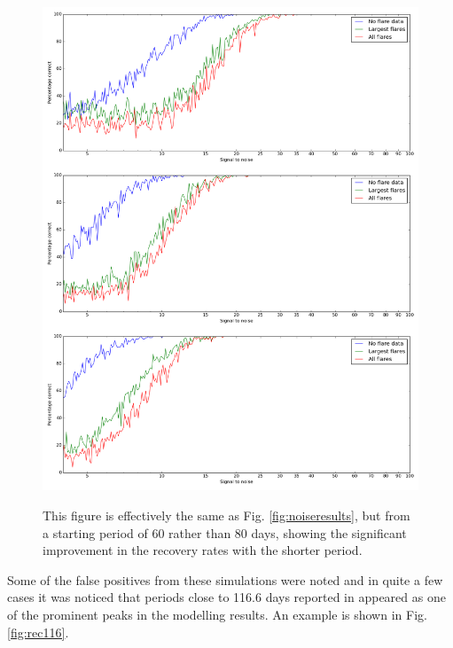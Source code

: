 \begin{figure}[!htbp]
\begin{center}
\includegraphics[scale=0.25]{Figures/Np60.png} \\
\end{center}
\caption{This figure is effectively the same as Fig. \ref{fig:noiseresults}, but from a starting period of 60 rather
  than 80 days, showing the significant improvement in the recovery rates with the shorter period.}
\protect\label{fig:noiseresults60}
\end{figure}

Some of the false positives from these simulations were noted and in quite a few cases it was noticed that periods close
to 116.6 days reported in \citet[Table 3]{suarezmascareno15} appeared as one of the prominent peaks in the modelling
results. An example is shown in Fig. \ref{fig:rec116}.

